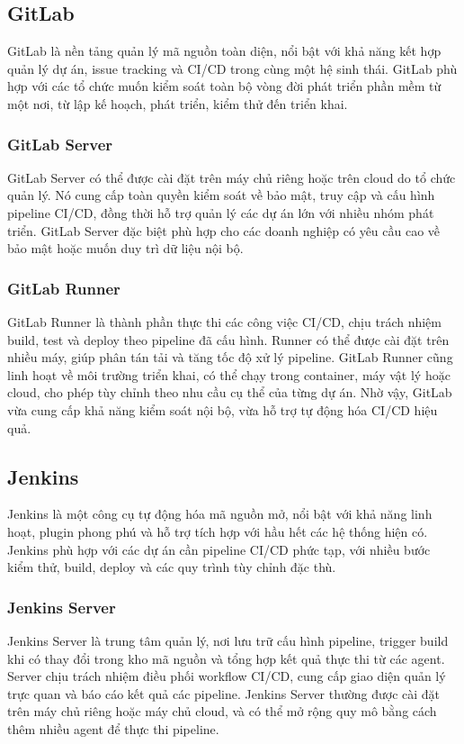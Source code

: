 \subsection{GitLab}

GitLab là nền tảng quản lý mã nguồn toàn diện, nổi bật với khả năng kết hợp quản lý dự án, issue tracking và CI/CD trong cùng một hệ sinh thái. GitLab phù hợp với các tổ chức muốn kiểm soát toàn bộ vòng đời phát triển phần mềm từ một nơi, từ lập kế hoạch, phát triển, kiểm thử đến triển khai.

\subsubsection{GitLab Server}
GitLab Server có thể được cài đặt trên máy chủ riêng hoặc trên cloud do tổ chức quản lý. Nó cung cấp toàn quyền kiểm soát về bảo mật, truy cập và cấu hình pipeline CI/CD, đồng thời hỗ trợ quản lý các dự án lớn với nhiều nhóm phát triển. GitLab Server đặc biệt phù hợp cho các doanh nghiệp có yêu cầu cao về bảo mật hoặc muốn duy trì dữ liệu nội bộ.

\subsubsection{GitLab Runner}
GitLab Runner là thành phần thực thi các công việc CI/CD, chịu trách nhiệm build, test và deploy theo pipeline đã cấu hình. Runner có thể được cài đặt trên nhiều máy, giúp phân tán tải và tăng tốc độ xử lý pipeline. GitLab Runner cũng linh hoạt về môi trường triển khai, có thể chạy trong container, máy vật lý hoặc cloud, cho phép tùy chỉnh theo nhu cầu cụ thể của từng dự án. Nhờ vậy, GitLab vừa cung cấp khả năng kiểm soát nội bộ, vừa hỗ trợ tự động hóa CI/CD hiệu quả.

\subsection{Jenkins}

Jenkins là một công cụ tự động hóa mã nguồn mở, nổi bật với khả năng linh hoạt, plugin phong phú và hỗ trợ tích hợp với hầu hết các hệ thống hiện có. Jenkins phù hợp với các dự án cần pipeline CI/CD phức tạp, với nhiều bước kiểm thử, build, deploy và các quy trình tùy chỉnh đặc thù.

\subsubsection{Jenkins Server}
Jenkins Server là trung tâm quản lý, nơi lưu trữ cấu hình pipeline, trigger build khi có thay đổi trong kho mã nguồn và tổng hợp kết quả thực thi từ các agent. Server chịu trách nhiệm điều phối workflow CI/CD, cung cấp giao diện quản lý trực quan và báo cáo kết quả các pipeline. Jenkins Server thường được cài đặt trên máy chủ riêng hoặc máy chủ cloud, và có thể mở rộng quy mô bằng cách thêm nhiều agent để thực thi pipeline.

